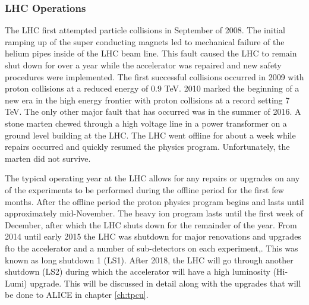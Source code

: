 \subsubsection{LHC Operations}
The LHC first attempted particle collisions in September of 2008.  The initial ramping up of the super conducting magnets led to mechanical failure of the helium pipes inside of the LHC beam line.  This fault caused the LHC to remain shut down for over a year while the accelerator was repaired and new safety procedures were implemented. The first successful collisions occurred in 2009 with proton collisions at a reduced energy of 0.9 TeV.  2010 marked the beginning of a new era in the high energy frontier with proton collisions at a record setting 7 TeV.  The only other major fault that has occurred was in the summer of 2016. A stone marten chewed through a high voltage line in a power transformer on a ground level building at the LHC.  The LHC went offline for about a week while repairs occurred and quickly resumed the physics program.  Unfortunately, the marten did not survive.

The typical operating year at the LHC allows for any repairs or upgrades on any of the experiments to be performed during the offline period for the first few months.  After the offline period the proton physics program begins and lasts until approximately mid-November.  The heavy ion program lasts until the first week of December, after which the LHC shuts down for the remainder of the year.  From 2014 until early 2015 the LHC was shutdown for major renovations and upgrades fto the accelerator and a number of sub-detectors on each experiment,. This was known as long shutdown 1 (LS1).  After 2018, the LHC will go through another shutdown (LS2) during which the accelerator will have a high luminosity (Hi-Lumi) upgrade.  This will be discussed in detail along with the upgrades that will be done to ALICE in chapter \ref{ch:tpcu}.

